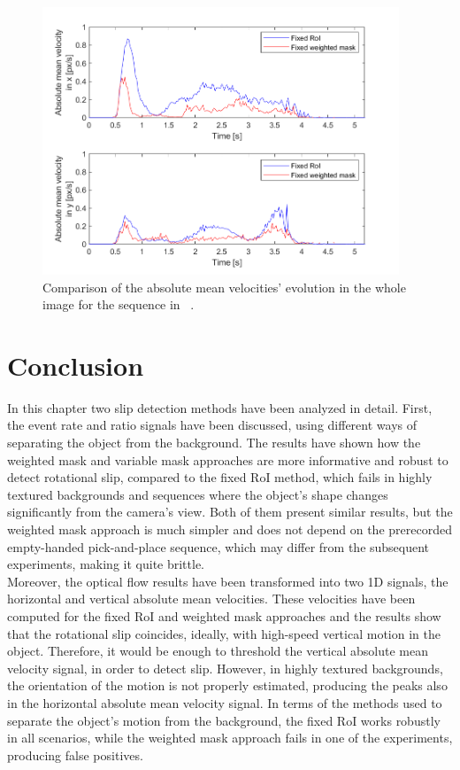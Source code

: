 \begin{figure}[H]
    \centering
    \includegraphics[width=0.95\textwidth]{resources/images/OF_comparison_hb1_tt}
    \caption{Comparison of the absolute mean velocities' evolution in the whole image for the sequence in ~.}\label{fig:OF_comparison_hb1_tt}
\end{figure}

\section{Conclusion}

In this chapter two slip detection methods have been analyzed in detail. First, the event rate and ratio signals have been discussed, using different ways of separating the object from the background. The results have shown how the weighted mask and variable mask approaches are more informative and robust to detect rotational slip, compared to the fixed RoI method, which fails in highly textured backgrounds and  sequences where the object's shape changes significantly from the camera's view. Both of them present similar results, but the weighted mask approach is much simpler and does not depend on the prerecorded empty-handed pick-and-place sequence, which may differ from the subsequent experiments, making it quite brittle.\\

Moreover, the optical flow results have been transformed into two 1D signals, the horizontal and vertical absolute mean velocities. These velocities have been computed for the fixed RoI and weighted mask approaches and the results show that the rotational slip coincides, ideally, with high-speed vertical motion in the object. Therefore, it would be enough to threshold the vertical absolute mean velocity signal, in order to detect slip. However, in highly textured backgrounds, the orientation of the motion is not properly estimated, producing the peaks also in the horizontal absolute mean velocity signal. In terms of the methods used to separate the object's motion from the background, the fixed RoI works robustly in all scenarios, while the weighted mask approach fails in one of the experiments, producing false positives.\\

